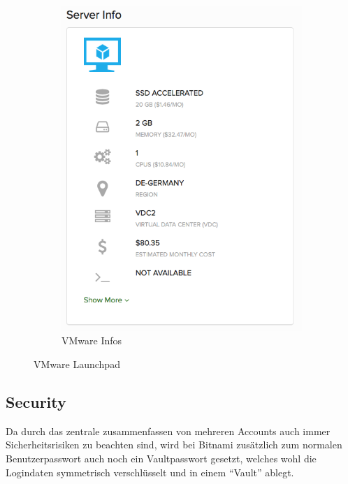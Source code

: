 \begin{figure}[!htbp]
\begin{subfigure}[b]{.39\textwidth}
\includegraphics[width=\textwidth]{./03_Analyse/03_Bitnami/images/vmware_infos}
\caption{VMware Infos}
\end{subfigure}
   \caption{VMware Launchpad}
\end{figure}


  \subsection{Security}
  Da durch das zentrale zusammenfassen von mehreren Accounts auch immer 
Sicherheitsrisiken zu beachten sind, wird bei Bitnami zusätzlich zum normalen 
Benutzerpasswort auch noch ein Vaultpasswort gesetzt, welches wohl die 
Logindaten symmetrisch verschlüsselt und in einem ``Vault'' ablegt.

